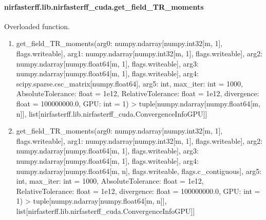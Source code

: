 \documentclass[letterpaper,10pt,english]{sphinxmanual}
\begin{document}
\begin{fulllineitems}
\pysigstopsignatures
\end{fulllineitems}


\sphinxstepscope


\paragraph{nirfasterff.lib.nirfasterff\_cuda.get\_field\_TR\_moments}
\label{\detokenize{_autosummary/nirfasterff.lib.nirfasterff_cuda.get_field_TR_moments:nirfasterff-lib-nirfasterff-cuda-get-field-tr-moments}}\label{\detokenize{_autosummary/nirfasterff.lib.nirfasterff_cuda.get_field_TR_moments::doc}}

\begin{fulllineitems}
\label{\detokenize{_autosummary/nirfasterff.lib.nirfasterff_cuda.get_field_TR_moments:nirfasterff.lib.nirfasterff_cuda.get_field_TR_moments}}
\pysigstartsignatures
{}
\pysigstopsignatures
\sphinxAtStartPar
Overloaded function.
\begin{enumerate}
%
\item {} 
\sphinxAtStartPar
get\_field\_TR\_moments(arg0: numpy.ndarray{[}numpy.int32{[}m, 1{]}, flags.writeable{]}, arg1: numpy.ndarray{[}numpy.int32{[}m, 1{]}, flags.writeable{]}, arg2: numpy.ndarray{[}numpy.float64{[}m, 1{]}, flags.writeable{]}, arg3: numpy.ndarray{[}numpy.float64{[}m, 1{]}, flags.writeable{]}, arg4: scipy.sparse.csc\_matrix{[}numpy.float64{]}, arg5: int, max\_iter: int = 1000, AbsoluteTolerance: float = 1e\sphinxhyphen{}12, RelativeTolerance: float = 1e\sphinxhyphen{}12, divergence: float = 100000000.0, GPU: int = \sphinxhyphen{}1) \sphinxhyphen{}\textgreater{} tuple{[}numpy.ndarray{[}numpy.float64{[}m, n{]}{]}, list{[}nirfasterff.lib.nirfasterff\_cuda.ConvergenceInfoGPU{]}{]}

\item {} 
\sphinxAtStartPar
get\_field\_TR\_moments(arg0: numpy.ndarray{[}numpy.int32{[}m, 1{]}, flags.writeable{]}, arg1: numpy.ndarray{[}numpy.int32{[}m, 1{]}, flags.writeable{]}, arg2: numpy.ndarray{[}numpy.float64{[}m, 1{]}, flags.writeable{]}, arg3: numpy.ndarray{[}numpy.float64{[}m, 1{]}, flags.writeable{]}, arg4: numpy.ndarray{[}numpy.float64{[}m, n{]}, flags.writeable, flags.c\_contiguous{]}, arg5: int, max\_iter: int = 1000, AbsoluteTolerance: float = 1e\sphinxhyphen{}12, RelativeTolerance: float = 1e\sphinxhyphen{}12, divergence: float = 100000000.0, GPU: int = \sphinxhyphen{}1) \sphinxhyphen{}\textgreater{} tuple{[}numpy.ndarray{[}numpy.float64{[}m, n{]}{]}, list{[}nirfasterff.lib.nirfasterff\_cuda.ConvergenceInfoGPU{]}{]}

\end{enumerate}

\end{fulllineitems}
\end{document}
